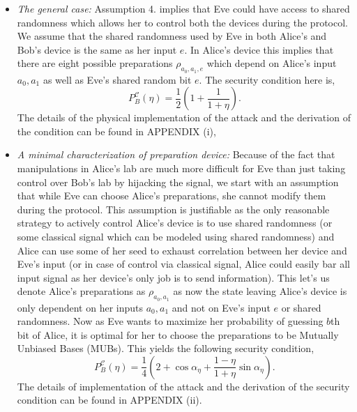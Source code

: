 \documentclass[smallextended]{svjour3}
\begin{document}
\begin{itemize}
\item \textit{The general case:} Assumption 4. implies that Eve could have access to shared randomness which allows her to control both the devices during the protocol. We assume that the shared randomness used by Eve in both Alice's and Bob's device is the same as her input $e$. In Alice's device this implies that there are eight possible preparations $\rho_{a_0,a_1,e}$ which depend on Alice's input $a_0,a_1$ as well as Eve's shared random bit $e$. The security condition here is, 
\begin{equation} \label{maxMe}
P_B^{\mathcal{C}}(\eta)=\frac{1}{2}(1+\frac{1}{1+\eta}).
\end{equation}
The details of the physical implementation of the attack and the derivation of the condition can be found in APPENDIX (i),

\item \textit{A minimal characterization of preparation device:} Because of the fact that manipulations in Alice's lab are much more difficult for Eve than just taking control over Bob's lab by hijacking the signal, we start with an assumption that while Eve can choose Alice's preparations, she cannot modify them during the protocol. This assumption is justifiable as the only reasonable strategy to actively control Alice's device is to use shared randomness (or some classical signal which can be modeled using shared randomness) and Alice can use some of her seed to exhaust correlation between her device and Eve's input (or in case of control via classical signal, Alice could easily bar all input signal as her device's only job is to send information). 
This let's us denote Alice's preparations as $\rho_{a_0,a_1}$ as now the state leaving Alice's device is only dependent on her inputs $a_0,a_1$ and not on Eve's input $e$ or shared randomness. Now as Eve wants to maximize her probability of guessing $b$th bit of Alice, it is optimal for her to choose the preparations to be Mutually Unbiased Bases (MUBs). This yields the following security condition, 
\begin{equation} \label{m1}
P_B^{\mathcal{C}}(\eta)=\frac{1}{4}\left(2+\cos \alpha_\eta+\frac{1-\eta}{1+\eta}\sin\alpha_\eta\right).
\end{equation} 
The details of implementation of the attack and the derivation of the security condition can be found in APPENDIX (ii).	
\end{itemize}
\end{document}
